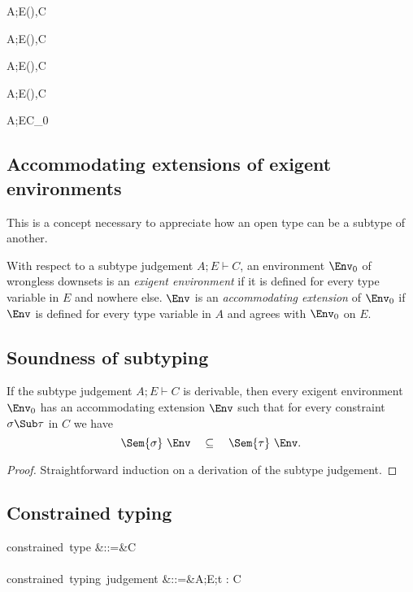 \documentclass{amsart}
\theoremstyle{definition}
\begin{document}
{A;E\vdash(\All\alpha\sigma)\Sub\tau,C}

{A;E\vdash\sigma\Sub(\Ex\alpha\tau),C}

{A;E\vdash(\Ex\alpha\sigma)\Sub\tau,C}

{A;E\vdash\sigma\Sub(\All\alpha\tau),C}

{A;E\vdash C_0}

\subsection{Accommodating extensions of exigent environments}
This is a concept necessary to appreciate how an open type can be
a subtype of another.

With respect to a subtype judgement $A;E\vdash C$, an environment
$\Env_0$ of wrongless downsets is an \emph{exigent environment}
if it is defined for every type variable in $E$ and nowhere else.
$\Env$ is an \emph{accommodating extension} of $\Env_0$ if $\Env$
is defined for every type variable in $A$ and agrees with
$\Env_0$ on $E$.

\subsection{Soundness of subtyping}
\label{subsound}
If the subtype judgement $A;E\vdash C$ is derivable, then every
exigent environment $\Env_0$ has an accommodating extension
$\Env$ such that for every constraint $\sigma\Sub\tau$ in $C$ we
have
\[
\Sem{\sigma}~\Env \quad \subseteq \quad \Sem{\tau}~\Env.
\]

\begin{proof}
Straightforward induction on a derivation of the subtype judgement.
\end{proof}

\subsection{Constrained typing}
\begin{syntax}
\mbox{constrained type}
&::=&\tau \Given C
\\\\
\mbox{constrained typing judgement}
&::=&A;E;\Gamma \vdash t : \tau \Given C
\end{syntax}
\end{document}
